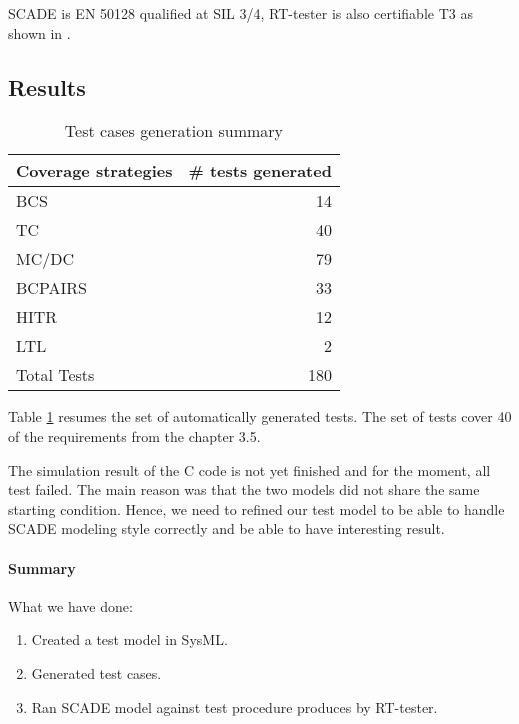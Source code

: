 SCADE is EN 50128 qualified at SIL 3/4, RT-tester is also certifiable
T3 as shown in \cite{peleska_efficient_2012}.

\subsection{Results}

\begin{table}[htbp]
\centering
\begin{tabular}{lr}\toprule
  Coverage strategies & \# tests generated  \\\midrule
  BCS & 14 \\
  TC & 40 \\
  MC/DC & 79 \\
  BCPAIRS & 33\\
  HITR & 12 \\
  LTL & 2 \\ \midrule
  Total Tests& 180\\\bottomrule
\end{tabular}

\vspace{1em}
\caption{\label{tbl:test_summary} Test cases generation summary}
\end{table}

Table \ref{tbl:test_summary} resumes the set of automatically
generated tests.
The set of tests cover 40 of the requirements from the chapter 3.5.


The simulation result of the C code is not yet finished and for the
moment, all test failed. The main reason was that the two
models did not share the same starting condition.
Hence, we  need to refined our test model to be able to handle SCADE
modeling style correctly and be able to have interesting result.



\paragraph{Summary}

What we have done:
\begin{enumerate}
\item Created a test model in SysML.
\item Generated test cases.
\item Ran SCADE model against test procedure produces by RT-tester.
\end{enumerate}
 
